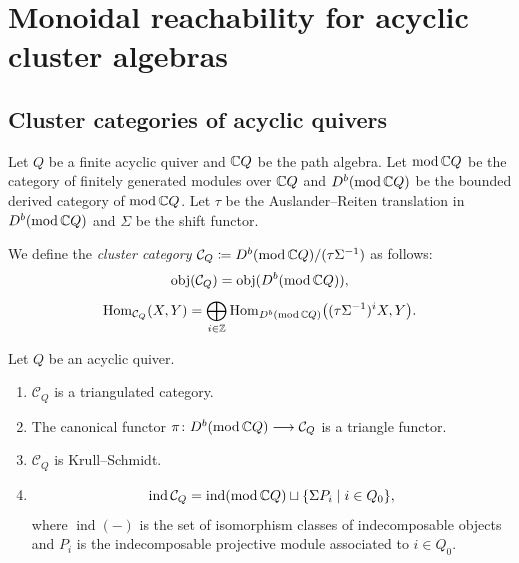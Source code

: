 \section{Monoidal reachability for acyclic cluster algebras}
\label{Sec : monoidal reachability for acyclic cluster algebras}

\subsection{Cluster categories of acyclic quivers}
\label{ssec : cluster categories of acyclic quivers}

Let $Q$ be a finite acyclic quiver and $\mathbb{C} Q$ be the path algebra.
Let $\operatorname{mod}\mathbb{C} Q$ be the category of finitely generated
modules over $\mathbb{C} Q$ and $D^b(\operatorname{mod}\mathbb{C} Q)$ be the bounded
derived category of $\operatorname{mod}\mathbb{C} Q$.
Let $\tau$ be the Auslander--Reiten translation in
$D^b(\operatorname{mod}\mathbb{C} Q)$ and $\Sigma$ be the shift functor.

\begin{Def}
\label{Def : cluster category}
We define the \emph{cluster category}
$\mathcal{C}_Q \coloneq
D^b(\operatorname{mod}\mathbb{C} Q)/(\tau\Sigma^{-1})$ as follows:
\[
\operatorname{obj}(\mathcal{C}_Q)
= \operatorname{obj}(D^b(\operatorname{mod}\mathbb{C} Q)),
\]
\[
\operatorname{Hom}_{\mathcal{C}_Q}(X, Y)
= \bigoplus_{i \in \mathbb{Z}}
\operatorname{Hom}_{D^b(\operatorname{mod}\mathbb{C} Q)}
\bigl((\tau\Sigma^{-1})^iX, Y\bigr).
\]
\end{Def}

\begin{Prop}
\label{Prop : properties of cluster categories}
Let $Q$ be an acyclic quiver.
\begin{enumerate}
    \item[(i)] $\mathcal{C}_Q$ is a triangulated category.
    \item[(ii)] The canonical functor
    $\pi \colon D^b(\operatorname{mod}\mathbb{C} Q) \longrightarrow
    \mathcal{C}_Q$ is a triangle functor.
    \item[(iii)] $\mathcal{C}_Q$ is Krull--Schmidt.
    \item[(iv)]
    \[
    \operatorname{ind}\mathcal{C}_Q
    = \operatorname{ind}(\operatorname{mod}\mathbb{C} Q)
    \sqcup \{\Sigma P_i \mid i \in Q_0\},
    \]
    where $\operatorname{ind}(-)$ is the set of isomorphism classes
    of indecomposable objects and $P_i$ is the indecomposable
    projective module associated to $i \in Q_0$.
\end{enumerate}
\end{Prop}


